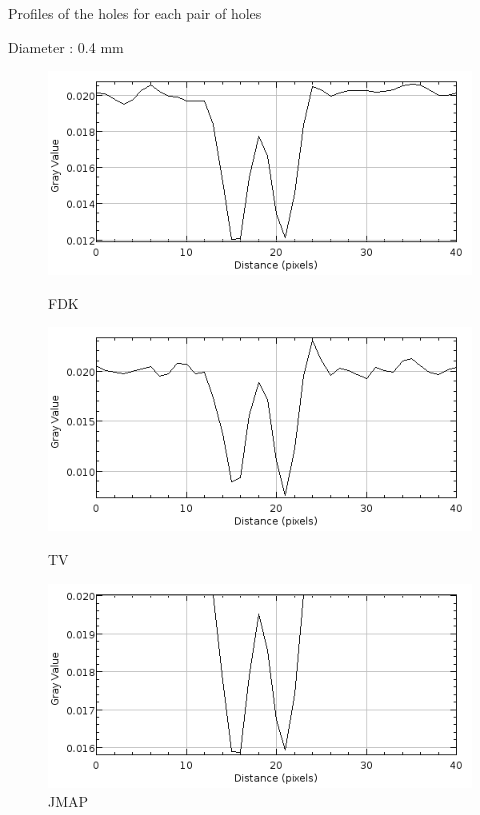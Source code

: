 \documentclass[latex]{beamer}
\begin{document}
\begin{frame}{Profiles of the holes for each pair of holes}
\begin{block}{Diameter : 0.4 mm}
\begin{figure}
\begin{minipage}[htb]{0.46\linewidth}
\centering
\includegraphics[scale=0.27]{ProfilsTrousIQICalculResolution/FDK/300proj/ProfilTrousTaille4.png}
\caption*{FDK}
\end{minipage} \hfill
\begin{minipage}[htb]{0.46\linewidth}
\centering
\includegraphics[scale=0.27]{ProfilsTrousIQICalculResolution/TV/300proj/ProfilTrousTaille4.png}
\caption*{TV}
\end{minipage} \vfill
\begin{minipage}[htb]{0.46\linewidth}
\centering
\includegraphics[scale=0.27]{ProfilsTrousIQICalculResolution/JMAPMGINonSplitGamma3K4/300proj/ProfilTrousTaille4.png}
\caption*{JMAP}
\end{minipage}
\end{figure}
\end{block}
\end{frame}
\end{document}
